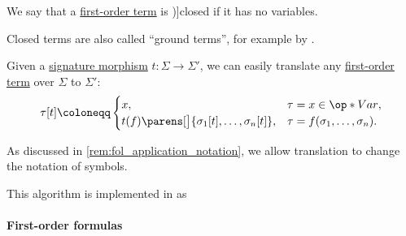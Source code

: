 \begin{definition}\label{def:fol_closed_term}
  We say that a \hyperref[def:fol_term]{first-order term} is \term[ru=замкнутый терм (\cite[62]{КолмогоровДрагалин2006ЛогикаВведение})]{closed} if it has no variables.
\end{definition}
\begin{comments}
  \item Closed terms are also called \enquote{ground terms}, for example by \textcite[def. 3.1.5]{BaaderNipkow2012TermRewriting}.
\end{comments}

\begin{algorithm}\label{alg:fol_term_signature_translation}
  Given a \hyperref[def:fol_signature_category/morphisms]{signature morphism} \( t: \Sigma \to \Sigma' \), we can easily translate any \hyperref[def:fol_term]{first-order term} over \( \Sigma \) to \( \Sigma' \):
  \begin{equation*}
    \tau[t] \coloneqq \begin{cases}
      x,                                                     &\tau = x \in \op*{Var}, \\
      t(f)\parens[\big]{ \sigma_1[t], \ldots, \sigma_n[t] }, &\tau = f(\sigma_1, \ldots, \sigma_n).
    \end{cases}
  \end{equation*}
\end{algorithm}
\begin{comments}
  \item As discussed in \cref{rem:fol_application_notation}, we allow translation to change the notation of symbols.
  \item This algorithm is implemented in \cite{notebook:code} as
  \begin{CodeRefDisplay}
  \end{CodeRefDisplay}
\end{comments}

\paragraph{First-order formulas}

